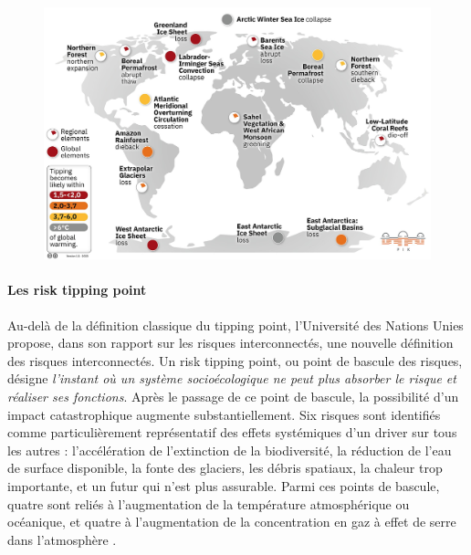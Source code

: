 \begin{figure}
    \centering
    \includegraphics[width=1\linewidth]{figures/Tipping_points_2022_list.jpeg}
    \label{fig:tipping-points-earth}
\end{figure}

\paragraph{Les \gls{risk tipping point}}

Au-delà de la définition classique du tipping point, l'Université des Nations Unies propose, dans son rapport sur les risques interconnectés, une nouvelle définition des risques interconnectés. Un \gls{risk tipping point}, ou point de bascule des risques, désigne \textit{l'instant où un système socioécologique ne peut plus absorber le risque et réaliser ses fonctions}. Après le passage de ce point de bascule, la possibilité d'un impact catastrophique augmente substantiellement. Six risques sont identifiés comme particulièrement représentatif des effets systémiques d'un driver sur tous les autres : l'accélération de l'extinction de la biodiversité, la réduction de l'eau de surface disponible, la fonte des glaciers, les débris spatiaux, la chaleur trop importante, et un futur qui n'est plus assurable. Parmi ces points de bascule, quatre sont  reliés à l'augmentation de la température atmosphérique ou océanique, et quatre à l'augmentation de la concentration en gaz à effet de serre dans l'atmosphère \autocite{united_nations_university_-_institute_for_environment_and_human_security_unu-ehs_interconnected_2023}.

